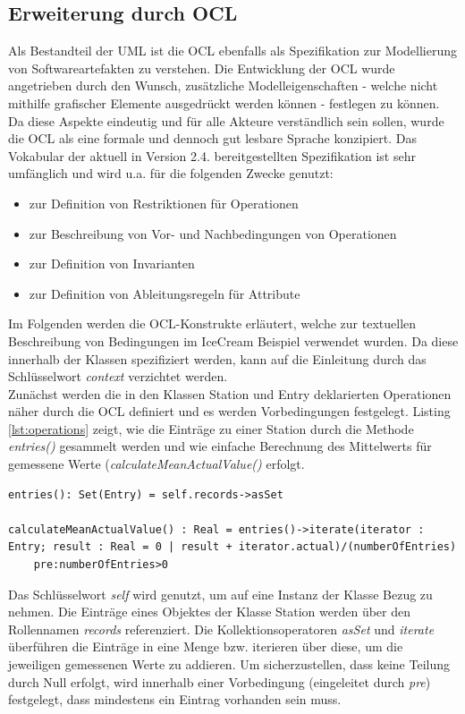 \documentclass[a4paper,twoside]{article}
\begin{document}
\subsection{Erweiterung durch OCL} 
\label{ssec:ocl}
Als Bestandteil der UML ist die OCL ebenfalls als Spezifikation zur Modellierung von Softwareartefakten zu verstehen. Die Entwicklung der OCL wurde angetrieben durch den Wunsch, zusätzliche Modelleigenschaften - welche nicht mithilfe grafischer Elemente ausgedrückt werden können - festlegen zu können. \cite[S.5f]{OCLFormal} Da diese Aspekte eindeutig und für alle Akteure verständlich sein sollen, wurde die OCL als eine formale und dennoch gut lesbare Sprache konzipiert. Das Vokabular der aktuell in Version 2.4. bereitgestellten Spezifikation ist sehr umfänglich und wird u.a. für die folgenden Zwecke genutzt: \begin{itemize}
\item zur Definition von Restriktionen für Operationen
\item zur Beschreibung von Vor- und Nachbedingungen von Operationen 
\item zur Definition von Invarianten
\item zur Definition von Ableitungsregeln für Attribute
\end{itemize} 
Im Folgenden werden die OCL-Konstrukte erläutert, welche zur textuellen Beschreibung von Bedingungen im IceCream Beispiel verwendet wurden. Da diese innerhalb der Klassen spezifiziert werden, kann auf die Einleitung durch das Schlüsselwort \textit{context} verzichtet werden.  \\
Zunächst werden die in den Klassen Station und Entry deklarierten Operationen näher durch die OCL definiert und es werden Vorbedingungen festgelegt. Listing \ref{lst:operations} zeigt, wie die Einträge zu einer Station durch die Methode \textit{entries()} gesammelt werden und wie einfache Berechnung des Mittelwerts für gemessene Werte (\textit{calculateMeanActualValue()} erfolgt.  
\begin{lstlisting}[caption={OCL-erweiterte Operationen der Klasse Station},label=lst:operations]
entries(): Set(Entry) = self.records->asSet

calculateMeanActualValue() : Real = entries()->iterate(iterator : Entry; result : Real = 0 | result + iterator.actual)/(numberOfEntries) 
	pre:numberOfEntries>0
\end{lstlisting}
Das Schlüsselwort \textit{self} wird genutzt, um auf eine Instanz der Klasse Bezug zu nehmen. Die Einträge eines Objektes der Klasse Station werden über den Rollennamen \textit{records} referenziert. Die Kollektionsoperatoren \textit{asSet} und \textit{iterate} überführen die Einträge in eine Menge bzw. iterieren über diese, um die jeweiligen gemessenen Werte zu addieren. Um sicherzustellen, dass keine Teilung durch Null erfolgt, wird innerhalb einer Vorbedingung (eingeleitet durch \textit{pre}) festgelegt, dass mindestens ein Eintrag vorhanden sein muss. 
\end{document}

